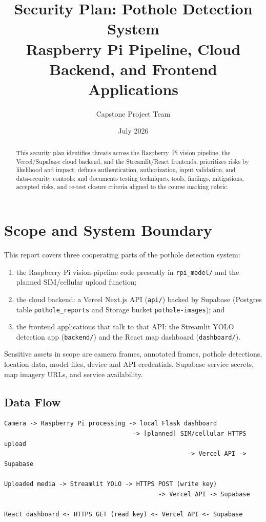 \documentclass[12pt]{article}
\title{Security Plan: Pothole Detection System\\
\large Raspberry Pi Pipeline, Cloud Backend, and Frontend Applications}
\author{Capstone Project Team}
\date{July 2026}
\begin{document}
\maketitle

\begin{abstract}
This security plan identifies threats across the Raspberry~Pi vision pipeline,
the Vercel/Supabase cloud backend, and the Streamlit/React frontends; prioritizes
risks by likelihood and impact; defines authentication, authorization, input
validation, and data-security controls; and documents testing techniques, tools,
findings, mitigations, accepted risks, and re-test closure criteria aligned to
the course marking rubric.
\end{abstract}

\tableofcontents
\newpage

\section{Scope and System Boundary}

This report covers three cooperating parts of the pothole detection system:

\begin{enumerate}
    \item the Raspberry Pi vision-pipeline code presently in \texttt{rpi\_model/}
          and the planned SIM/cellular upload function;
    \item the cloud backend: a Vercel Next.js API (\texttt{api/}) backed by
          Supabase (Postgres table \texttt{pothole\_reports} and Storage bucket
          \texttt{pothole-images}); and
    \item the frontend applications that talk to that API: the Streamlit YOLO
          detection app (\texttt{backend/}) and the React map dashboard
          (\texttt{dashboard/}).
\end{enumerate}

Sensitive assets in scope are camera frames, annotated frames, pothole
detections, location data, model files, device and API credentials, Supabase
service secrets, map imagery URLs, and service availability.

\subsection{Data Flow}

\begin{verbatim}
Camera -> Raspberry Pi processing -> local Flask dashboard
                                   -> [planned] SIM/cellular HTTPS upload
                                                  -> Vercel API -> Supabase

Uploaded media -> Streamlit YOLO -> HTTPS POST (write key)
                                          -> Vercel API -> Supabase

React dashboard <- HTTPS GET (read key) <- Vercel API <- Supabase
\end{verbatim}
\end{document}
